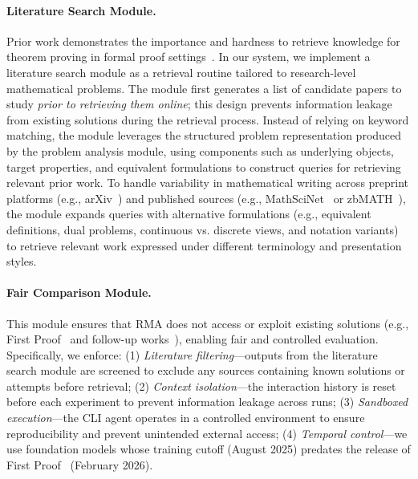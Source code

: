 \documentclass{article}
\newcommand{\modelname}{\textsc{RMA}\xspace}
\begin{document}
\vspace{-7pt}
\paragraph{Literature Search Module.}
Prior work demonstrates the importance and hardness to retrieve knowledge for theorem proving in formal proof settings~\cite{yang2023leandojo}. In our system, we implement a literature search module as a retrieval routine tailored to research-level mathematical problems. The module first generates a list of candidate papers to study \emph{prior to retrieving them online}; this design prevents information leakage from existing solutions during the retrieval process. Instead of relying on keyword matching, the module leverages the structured problem representation produced by the problem analysis module, using components such as underlying objects, target properties, and equivalent formulations to construct queries for retrieving relevant prior work. To handle variability in mathematical writing across preprint platforms (e.g., arXiv~\citep{arxiv}) and published sources (e.g., MathSciNet~\cite{mathscinet} or zbMATH~\cite{Deb_2024}), the module expands queries with alternative formulations (e.g., equivalent definitions, dual problems, continuous vs. discrete views, and notation variants) to retrieve relevant work expressed under different terminology and presentation styles.
\vspace{-7pt}
\paragraph{Fair Comparison Module.}
This module ensures that \modelname does not access or exploit existing solutions (e.g., First Proof~\citep{abouzaid2026first} and follow-up works~\citep{openai_first_proof_2025,aletheia}), enabling fair and controlled evaluation. Specifically, we enforce: 
(1) \emph{Literature filtering}—outputs from the literature search module are screened to exclude any sources containing known solutions or attempts before retrieval;
(2) \emph{Context isolation}—the interaction history is reset before each experiment to prevent information leakage across runs;
(3) \emph{Sandboxed execution}—the CLI agent operates in a controlled environment to ensure reproducibility and prevent unintended external access;
(4) \emph{Temporal control}—we use foundation models whose training cutoff (August 2025) predates the release of First Proof~\citep{abouzaid2026first} (February 2026).
\vspace{-10pt}
\end{document}
